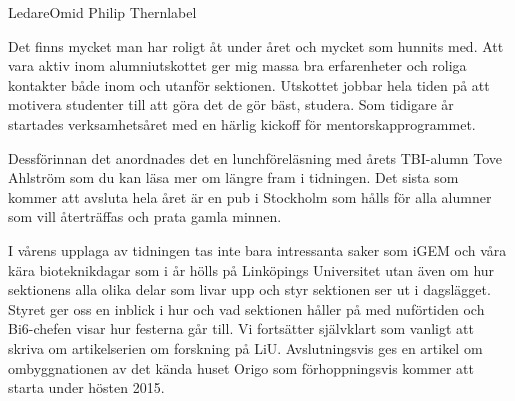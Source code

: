 

\begin{editorial}{3}{Ledare}{Omid Philip Thern}{label}



Det finns mycket man har
roligt åt under året och mycket som hunnits med. Att vara aktiv inom
alumniutskottet ger mig massa bra erfarenheter och roliga kontakter
både inom och utanför sektionen. Utskottet jobbar hela tiden på att
motivera studenter till att göra det de gör bäst, studera. Som
tidigare år startades verksamhetsåret med en härlig kickoff för
mentorskapprogrammet. 

Dessförinnan det anordnades det en
lunchföreläsning med årets TBI-alumn Tove Ahlström som du kan läsa mer
om längre fram i tidningen. Det sista som kommer att avsluta hela året
är en pub i Stockholm som hålls för alla alumner som vill återträffas
och prata gamla minnen.


I vårens upplaga av tidningen tas inte bara intressanta saker som iGEM
och våra kära bioteknikdagar som i år hölls på Linköpings Universitet
utan även om hur sektionens alla olika delar som livar upp och styr
sektionen ser ut i dagslägget. Styret ger oss en inblick i hur och vad
sektionen håller på med nuförtiden och Bi6-chefen visar hur festerna
går till. Vi fortsätter självklart som vanligt att skriva om
artikelserien om forskning på LiU. Avslutningsvis ges en artikel om
ombyggnationen av det kända huset Origo som förhoppningsvis kommer att
starta under hösten 2015.





\end{editorial}